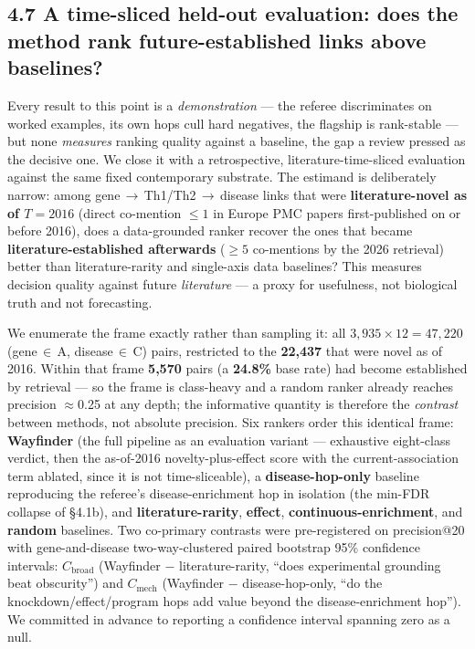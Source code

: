 \subsection*{4.7 A time-sliced held-out evaluation: does the method rank future-established links above baselines?}\label{a-time-sliced-held-out-evaluation}

Every result to this point is a \emph{demonstration} --- the referee discriminates on worked examples, its own
hops cull hard negatives, the flagship is rank-stable --- but none \emph{measures} ranking quality against a
baseline, the gap a review pressed as the decisive one. We close it with a retrospective, literature-time-sliced
evaluation against the same fixed contemporary substrate. The estimand is deliberately narrow: among
gene\,$\rightarrow$\,Th1/Th2\,$\rightarrow$\,disease links that were \textbf{literature-novel as of $T=2016$}
(direct co-mention $\leq 1$ in Europe PMC papers first-published on or before 2016), does a data-grounded
ranker recover the ones that became \textbf{literature-established afterwards} ($\geq 5$ co-mentions by the
2026 retrieval) better than literature-rarity and single-axis data baselines? This measures decision quality
against future \emph{literature} --- a proxy for usefulness, not biological truth and not forecasting.

We enumerate the frame exactly rather than sampling it: all $3{,}935 \times 12 = 47{,}220$
(gene\,$\in$\,A, disease\,$\in$\,C) pairs, restricted to the \textbf{22{,}437} that were novel as of 2016.
Within that frame \textbf{5{,}570} pairs (a \textbf{24.8\%} base rate) had become established by retrieval --- so
the frame is class-heavy and a random ranker already reaches precision $\approx$0.25 at any depth; the
informative quantity is therefore the \emph{contrast} between methods, not absolute precision. Six rankers order
this identical frame: \textbf{Wayfinder} (the full pipeline as an evaluation variant --- exhaustive eight-class
verdict, then the as-of-2016 novelty-plus-effect score with the current-association term ablated, since it is
not time-sliceable), a \textbf{disease-hop-only} baseline reproducing the referee's disease-enrichment hop in
isolation (the min-FDR collapse of \S{}4.1b), and \textbf{literature-rarity}, \textbf{effect},
\textbf{continuous-enrichment}, and \textbf{random} baselines. Two co-primary contrasts were pre-registered on
precision@20 with gene-and-disease two-way-clustered paired bootstrap 95\% confidence intervals:
$C_{\mathrm{broad}}$ (Wayfinder $-$ literature-rarity, ``does experimental grounding beat obscurity'') and
$C_{\mathrm{mech}}$ (Wayfinder $-$ disease-hop-only, ``do the knockdown/effect/program hops add value beyond the
disease-enrichment hop''). We committed in advance to reporting a confidence interval spanning zero as a null.


